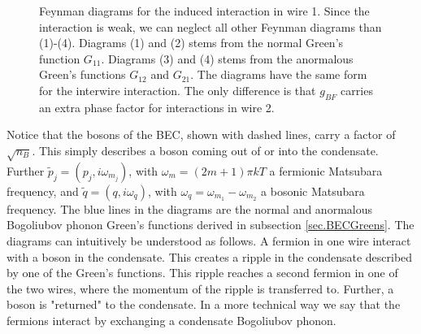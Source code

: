 \begin{figure}
\caption{Feynman diagrams for the induced interaction in wire 1. Since the interaction is weak, we can neglect all other Feynman diagrams than (1)-(4). Diagrams (1) and (2) stems from the normal Green's function $G_{11}$. Diagrams (3) and (4) stems from the anormalous Green's functions $G_{12}$ and $G_{21}$. The diagrams have the same form for the interwire interaction. The only difference is that $g_{BF}$ carries an extra phase factor for interactions in wire 2. } 
\label{fig.feynmandiagrams}
\end{figure}

Notice that the bosons of the BEC, shown with dashed lines, carry a factor of $\sqrt{n_B}$. This simply describes a boson coming out of or into the condensate. Further $\tilde{p}_j = (p_j, i\omega_{m_j})$, with $\omega_{m} = (2m + 1)\pi kT$ a fermionic Matsubara frequency, and $\tilde{q} = (q, i\omega_q )$, with $\omega_q = \omega_{m_1} - \omega_{m_2}$ a bosonic Matsubara frequency. The blue lines in the diagrams are the normal and anormalous Bogoliubov phonon Green's functions derived in subsection \ref{sec.BECGreens}. The diagrams can intuitively be understood as follows. A fermion in one wire interact with a boson in the condensate. This creates a ripple in the condensate described by one of the Green's functions. This ripple reaches a second fermion in one of the two wires, where the momentum of the ripple is transferred to. Further, a boson is "returned" to the condensate. In a more technical way we say that the fermions interact by exchanging a condensate Bogoliubov phonon.   

